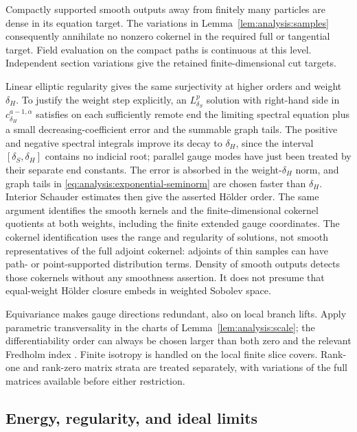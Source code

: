 Compactly supported smooth outputs away from finitely many particles
are dense in its equation target.  The variations in
Lemma~\ref{lem:analysis:samples} consequently annihilate no nonzero
cokernel in the required full or tangential target.  Field evaluation
on the compact paths is continuous at this level.  Independent section
variations give the retained finite-dimensional cut targets.

Linear elliptic regularity gives the same surjectivity at higher orders and
weight $\delta_H$.  To justify the weight step explicitly, an
$L^p_{\delta_S}$ solution with right-hand side in
$c^{a-1,\alpha}_{\delta_H}$ satisfies on each sufficiently remote
end the limiting spectral equation plus a small decreasing-coefficient
error and the summable graph tails.  The positive and negative spectral
integrals improve its decay to $\delta_H$, since the interval
$[\delta_S,\delta_H]$ contains no indicial root; parallel gauge
modes have just been treated by their separate end constants.
The error is absorbed in the weight-$\delta_H$ norm, and graph tails
in \eqref{eq:analysis:exponential-seminorm} are chosen faster than
$\delta_H$.  Interior Schauder estimates then give the asserted
H\"older order.  The same argument identifies the smooth kernels and
the finite-dimensional cokernel quotients at both weights, including
the finite extended gauge coordinates.  The cokernel identification
uses the range and regularity of solutions, not smooth representatives
of the full adjoint cokernel: adjoints of thin samples can have path-
or point-supported distribution terms.  Density of smooth outputs
detects those cokernels without any smoothness assertion.
It does not presume that equal-weight H\"older
closure embeds in weighted Sobolev space.

Equivariance makes gauge directions redundant, also on local branch
lifts.  Apply parametric transversality in the charts of
Lemma~\ref{lem:analysis:scale}; the differentiability order can always
be chosen larger than both zero and the relevant Fredholm index
\cite[Theorem~1.3 and Corollary~1.5]{Smale1965}.
Finite isotropy is handled on the local finite slice
covers.  Rank-one and rank-zero matrix strata are treated separately,
with variations of the full matrices available before either restriction.

\subsection{Energy, regularity, and ideal limits}

